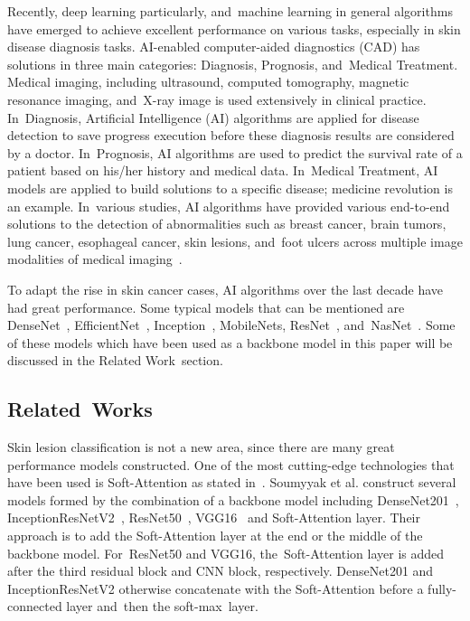 \documentclass[sensors,article,accept,pdftex,moreauthors]{Definitions/mdpi}
\begin{document}
Recently, deep learning particularly, and~machine learning in general algorithms have emerged to achieve excellent performance on various tasks, especially in skin disease diagnosis tasks. AI-enabled computer-aided diagnostics (CAD) has solutions in three main categories: Diagnosis, Prognosis, and~Medical Treatment. Medical imaging, including ultrasound, computed tomography, magnetic resonance imaging, and~X-ray image is used extensively in clinical practice. In~Diagnosis, Artificial Intelligence (AI) algorithms are applied for disease detection to save progress execution before these diagnosis results are considered by a doctor. In~Prognosis, AI algorithms are used to predict the survival rate of a patient based on his/her history and medical data. In~Medical Treatment, AI models are applied to build solutions to a specific disease; medicine revolution is an example. In~various studies, AI algorithms have provided various end-to-end solutions to the detection of abnormalities such as breast cancer, brain tumors, lung cancer, esophageal cancer, skin lesions, and~foot ulcers across multiple image modalities of medical imaging~\cite{11872}.

To adapt the rise in skin cancer cases, AI algorithms over the last decade have had great performance. Some typical models that can be mentioned are DenseNet~\cite{06993}, EfficientNet~\cite{04861}, Inception~\cite{00567}, MobileNets\cite{04861,04381,02244}, ResNet~\cite{03385,05027}, and~NasNet~\cite{07012}. Some of these models which have been used as a backbone model in this paper will be discussed in the Related Work~section.

\subsection{Related~Works}
Skin lesion classification is not a new area, since there are many great performance models constructed. One of the most cutting-edge technologies that have been used is Soft-Attention as stated in~\cite{03358}. Soumyyak et al. construct several models formed by the combination of a backbone model including DenseNet201~\cite{06993}, InceptionResNetV2~\cite{00567}, ResNet50~\cite{03385,05027}, VGG16~\cite{1556} and Soft-Attention layer. Their approach is to add the Soft-Attention layer at the end or the middle of the backbone model. For~ResNet50 and VGG16, the~Soft-Attention layer is added after the third residual block and CNN block, respectively. DenseNet201 and InceptionResNetV2 otherwise concatenate with the Soft-Attention before a fully-connected layer and~then the soft-max~layer.
\end{document}
